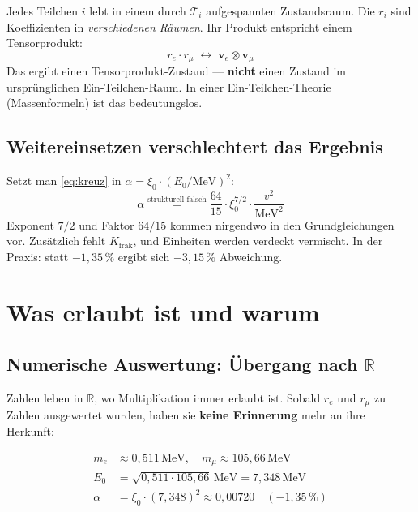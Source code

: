 Jedes Teilchen $i$ lebt in einem durch $\mathcal{T}_i$ aufgespannten
Zustandsraum. Die $r_i$ sind Koeffizienten in \emph{verschiedenen Räumen}.
Ihr Produkt entspricht einem Tensorprodukt:
\[
  r_e \cdot r_\mu \;\leftrightarrow\; \mathbf{v}_e \otimes \mathbf{v}_\mu
\]
Das ergibt einen Tensorprodukt-Zustand --- \textbf{nicht} einen Zustand
im ursprünglichen Ein-Teilchen-Raum. In einer Ein-Teilchen-Theorie
(Massenformeln) ist das bedeutungslos.

\subsection{Weitereinsetzen verschlechtert das Ergebnis}

Setzt man \eqref{eq:kreuz} in $\alpha = \xi_0 \cdot (E_0/\text{MeV})^2$:
\begin{equation}
  \alpha \stackrel{\text{strukturell falsch}}{=}
  \frac{64}{15} \cdot \xi_0^{7/2} \cdot \frac{v^2}{\text{MeV}^2}
\end{equation}
Exponent $7/2$ und Faktor $64/15$ kommen nirgendwo in den
Grundgleichungen vor. Zusätzlich fehlt $K_{\text{frak}}$,
und Einheiten werden verdeckt vermischt.
In der Praxis: statt $-1{,}35\,\%$ ergibt sich $-3{,}15\,\%$
Abweichung.

\section{Was erlaubt ist und warum}

\subsection{Numerische Auswertung: Übergang nach $\mathbb{R}$}

Zahlen leben in $\mathbb{R}$, wo Multiplikation immer erlaubt ist.
Sobald $r_e$ und $r_\mu$ zu Zahlen ausgewertet wurden, haben sie
\textbf{keine Erinnerung} mehr an ihre Herkunft:

\begin{align*}
  m_e &\approx 0{,}511\,\text{MeV}, \quad
  m_\mu \approx 105{,}66\,\text{MeV} \\
  E_0 &= \sqrt{0{,}511 \cdot 105{,}66}\,\text{MeV} = 7{,}348\,\text{MeV} \\
  \alpha &= \xi_0 \cdot (7{,}348)^2 \approx 0{,}00720 \quad (-1{,}35\,\%)
\end{align*}


